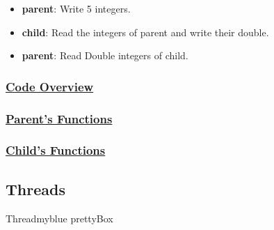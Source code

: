\begin{itemize}
    \item \textbf{parent}: Write 5 integers.
    \item \textbf{child}: Read the integers of parent and write their double.
    \item \textbf{parent}: Read Double integers of child.
\end{itemize}

\newpage
\null
\subsubsection*{\underline{Code Overview}}

\newpage
\subsubsection*{\underline{Parent's Functions}}

\subsubsection*{\underline{Child's Functions}}

\subsection{Threads}
\begin{prettyBox}{Thread}{myblue}
    prettyBox
\end{prettyBox}
